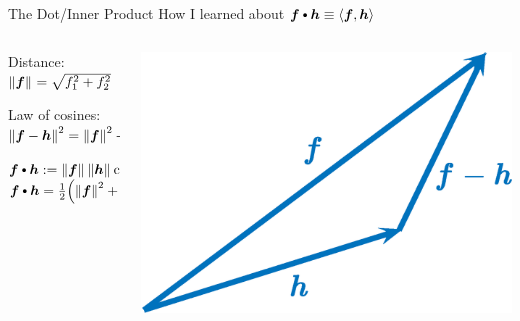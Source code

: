 \documentclass[10pt,compress,xcolor={usenames,dvipsnames},aspectratio=169]{beamer}
\begin{document}
\begin{frame}{The Dot/Inner Product}
How I learned about $\vf \bigcdot \vh \equiv \ip{\vf}{\vh}$
\begin{columns}
\begin{column}{0.5\textwidth}
\begin{description}
\setlength{\itemsep}{3ex}
\item[Geometry] Distance: $\left \lVert \boldsymbol{f} \right \rVert_{{}} = \sqrt{f_1^2 + f_2^2}$

\item[Trigonometry] Law of cosines: \\
\hspace{-10ex}$\left \lVert \boldsymbol{f}-\boldsymbol{h} \right \rVert_{{}}^2 = \left \lVert \boldsymbol{f} \right \rVert_{{}}^2 + \left \lVert \boldsymbol{h} \right \rVert_{{}}^2 - 2 \left \lVert \boldsymbol{f} \right \rVert_{{}}\left \lVert \boldsymbol{h} \right \rVert_{{}}\cos(\measuredangle(\boldsymbol{f},\boldsymbol{h}))$

\item[Physics] $\vf \bigcdot \vh := \norm{\vf}\norm{\vh}\cos(\measuredangle(\vf,\vh))$ \\
$\vf \bigcdot \vh  = \frac 12 \Bigl ( \norm{\vf}^2 + \norm{\vh}^2 - \norm{\vf-\vh}^2 \Bigr)$
\end{description}
\end{column}
\begin{column}{0.5\textwidth}
    \begin{center}
     \includegraphics[width=\textwidth]{ProgramsImages/fhfmh.eps}
     \end{center}
\end{column}
\end{columns}

\end{frame}
\end{document}
